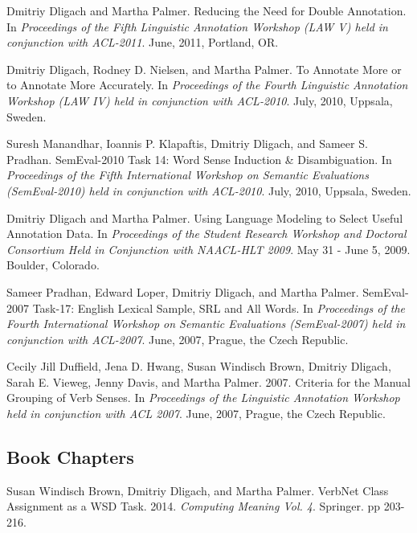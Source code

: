 \documentclass[letterpaper]{article}
\renewenvironment{itemize}{
  \begin{list}{}{
    \setlength{\leftmargin}{1.5em}
  }
}{
  \end{list}
}
\begin{document}
\begin{itemize}
\item Dmitriy Dligach and Martha Palmer. Reducing the Need for Double Annotation. In \emph{Proceedings of the Fifth Linguistic Annotation Workshop (LAW V) held in conjunction with ACL-2011}. June, 2011, Portland, OR.
\item Dmitriy Dligach, Rodney D. Nielsen, and Martha Palmer. To Annotate More or to Annotate More Accurately. In \emph{Proceedings of the Fourth Linguistic Annotation Workshop (LAW IV) held in conjunction with ACL-2010}. July, 2010, Uppsala, Sweden.
\item Suresh Manandhar, Ioannis P. Klapaftis, Dmitriy Dligach, and Sameer S. Pradhan. SemEval-2010 Task 14: Word Sense Induction \& Disambiguation. In \emph{Proceedings of the Fifth International Workshop on Semantic Evaluations (SemEval-2010) held in conjunction with ACL-2010}. July, 2010, Uppsala, Sweden.
\item Dmitriy Dligach and Martha Palmer. Using Language Modeling to Select Useful Annotation Data. In \emph {Proceedings of the Student Research Workshop and Doctoral Consortium Held in Conjunction with NAACL-HLT 2009}. May 31 - June 5, 2009. Boulder, Colorado.
\item Sameer Pradhan, Edward Loper, Dmitriy Dligach, and Martha Palmer. SemEval-2007 Task-17: English Lexical Sample, SRL and All Words. In \emph {Proceedings of the Fourth International Workshop on Semantic Evaluations (SemEval-2007) held in conjunction with ACL-2007}. June, 2007, Prague, the Czech Republic.
\item Cecily Jill Duffield, Jena D. Hwang, Susan Windisch Brown, Dmitriy Dligach, Sarah E. Vieweg, Jenny Davis, and Martha Palmer. 2007. Criteria for the Manual Grouping of Verb Senses. In \emph {Proceedings of the Linguistic Annotation Workshop held in conjunction with ACL 2007}. June, 2007, Prague, the Czech Republic.
\end{itemize}

\subsection*{Book Chapters}
\begin{itemize}
\item Susan Windisch Brown, Dmitriy Dligach, and Martha Palmer. VerbNet Class Assignment as a WSD Task. 2014. \emph{Computing Meaning Vol. 4}. Springer. pp 203-216.
\end{itemize}
\end{document}
